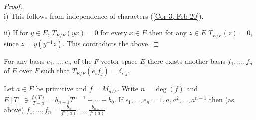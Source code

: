 \begin{proof}
	~\\
	i) This follows from independence of characters (\ref{Cor 3, Feb 20}).
	
	\noindent ii) If for $y \in E$, $T_{E/F}(yx) = 0$ for every $x \in E$ then for any $z \in E$ $T_{E/F}(z) = 0$, since $z = y(y^{-1}z)$. This contradicts the above.
\end{proof}

\begin{cor}
	For any basis $e_1, ..., e_n$ of the $F$-vector space $E$ there exists another basis $f_1, ..., f_n$ of $E$ over $F$ such that $T_{E/F}(e_if_j) = \delta_{i,j}$.
\end{cor}

\begin{prop}
	Let $a \in E$ be primitive and $f = M_{a/F}$. Write $n = \deg(f)$ and $E[T] \ni \frac{f(T)}{T - a} = b_{n-1}T^{n-1} + \cdots + b_0$. If $e_1, ..., e_n = 1, a, a^2, ..., a^{n-1}$ then (as above) $f_1, ..., f_n = \frac{b_0}{f'(a)}, ..., \frac{b_{n-1}}{f'(a)}$.
\end{prop}

